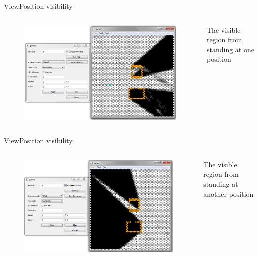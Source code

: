 \begin{frame}{View}{Position visibility}

\begin{columns}
\begin{figure}
\centering
\includegraphics[width = \textwidth]{./screenshot/position_visibility_view1.png}
\end{figure}

\begin{minipage}{\textwidth}
The visible region from standing at one position 
\end{minipage}
\end{columns}

\end{frame}

\begin{frame}{View}{Position visibility}

\begin{columns}
\begin{figure}
\centering
\includegraphics[width = \textwidth]{./screenshot/position_visibility_view2.png}
\end{figure}

\begin{minipage}{\textwidth}
The visible region from standing at another position 
\end{minipage}
\end{columns}

\end{frame}

